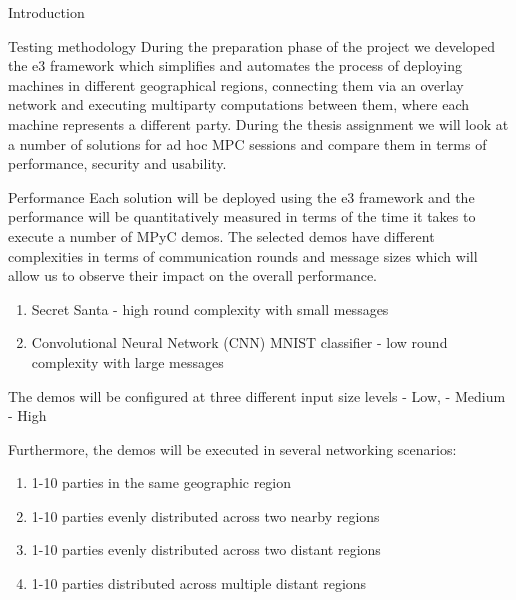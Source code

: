 \begin{frame}
\tableofcontents

\printnoidxglossary[type=\acronymtype,title=List of Abbreviations]
\listoffigures

\mainmatter
\end{frame}

\begin{frame}{Introduction}
\protect\hypertarget{introduction}{}
\end{frame}

\begin{frame}{Testing methodology}
\protect\hypertarget{testing-methodology}{}
During the preparation phase of the project we developed the \gls{e3}
framework which simplifies and automates the process of deploying
machines in different geographical regions, connecting them via an
overlay network and executing multiparty computations between them,
where each machine represents a different party. During the thesis
assignment we will look at a number of solutions for ad hoc MPC sessions
and compare them in terms of performance, security and usability.

\begin{block}{Performance}
\protect\hypertarget{performance}{}
Each solution will be deployed using the \gls{e3} framework and the
performance will be quantitatively measured in terms of the time it
takes to execute a number of MPyC demos. The selected demos have
different complexities in terms of communication rounds and message
sizes which will allow us to observe their impact on the overall
performance.

\begin{enumerate}
\tightlist
\item
  Secret Santa - high round complexity with small messages
\item
  Convolutional Neural Network (CNN) MNIST classifier - low round
  complexity with large messages
\end{enumerate}

The demos will be configured at three different input size levels - Low,
- Medium - High

Furthermore, the demos will be executed in several networking scenarios:

\begin{enumerate}
\tightlist
\item
  1-10 parties in the same geographic region
\item
  1-10 parties evenly distributed across two nearby regions
\item
  1-10 parties evenly distributed across two distant regions
\item
  1-10 parties distributed across multiple distant regions
\end{enumerate}
\end{block}


\end{frame}
